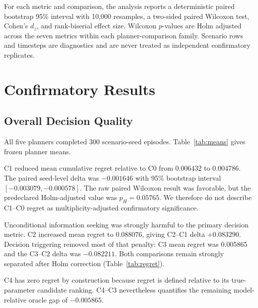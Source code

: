 \documentclass[journal]{IEEEtran}
\begin{document}
For each metric and comparison, the analysis reports a deterministic paired bootstrap 95\% interval with 10,000 resamples, a two-sided paired Wilcoxon test, Cohen's $d_z$, and rank-biserial effect size. Wilcoxon $p$-values are Holm adjusted across the seven metrics within each planner-comparison family. Scenario rows and timesteps are diagnostics and are never treated as independent confirmatory replicates.

\section{Confirmatory Results}
\subsection{Overall Decision Quality}
All five planners completed 300 scenario-seed episodes. Table~\ref{tab:means} gives frozen planner means.

\begin{table}[t]
\caption{Frozen confirmatory planner means.}
\label{tab:means}
\centering
\small
\resizebox{\columnwidth}{!}{}
\end{table}

C1 reduced mean cumulative regret relative to C0 from 0.006432 to 0.004786. The paired seed-level delta was $-0.001646$ with 95\% bootstrap interval $[-0.003079,-0.000578]$. The raw paired Wilcoxon result was favorable, but the predeclared Holm-adjusted value was $p_H=0.05765$. We therefore do not describe C1--C0 regret as multiplicity-adjusted confirmatory significance.

Unconditional information seeking was strongly harmful to the primary decision metric. C2 increased mean regret to 0.088076, giving C2--C1 delta $+0.083290$. Decision triggering removed most of that penalty: C3 mean regret was 0.005865 and the C3--C2 delta was $-0.082211$. Both comparisons remain strongly separated after Holm correction (Table~\ref{tab:regret}).

\begin{table}[t]
\caption{Primary seed-level cumulative-regret effects. Delta is planner B minus planner A.}
\label{tab:regret}
\centering
\small
\resizebox{\columnwidth}{!}{}
\end{table}

C4 has zero regret by construction because regret is defined relative to its true-parameter candidate ranking. C4--C3 nevertheless quantifies the remaining model-relative oracle gap of $-0.005865$.
\end{document}
